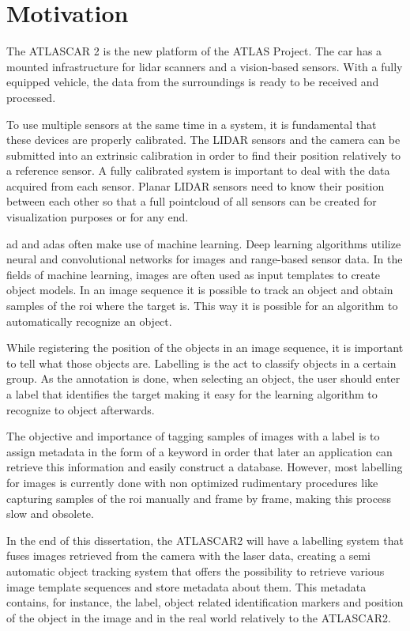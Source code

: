 \section{Motivation}
The ATLASCAR 2 is the new platform of the ATLAS Project. The car has a mounted infrastructure for \gls{lidar} scanners and a vision-based sensors. With a fully equipped vehicle, the data from the surroundings is ready to be received and processed. 

To use multiple sensors at the same time in a system, it is fundamental that these devices are properly calibrated. The LIDAR sensors and the camera can be submitted into an extrinsic calibration in order to find their position relatively to a reference sensor. A fully calibrated system is important to deal with the data acquired from each sensor. Planar LIDAR sensors need to know their position between each other so that a full pointcloud of all sensors can be created for visualization purposes or for any end.

\gls{ad} and \gls{adas} often make use of machine learning. Deep learning algorithms utilize neural and convolutional networks for images and range-based sensor data. In the fields of machine learning, images are often used as input templates to create object models. In an image sequence it is possible to track an object and obtain samples of the \gls{roi} where the target is. This way it is possible for an algorithm to automatically recognize an object.

While registering the position of the objects in an image sequence, it is important to tell what those objects are. Labelling is the act to classify objects in a certain group. As the annotation is done, when selecting an object, the user should enter a label that identifies the target making it easy for the learning algorithm to recognize to object afterwards.

The objective and importance of tagging samples of images with a label is to assign metadata in the form of a keyword in order that later an application can retrieve this information and easily construct a database. However, most labelling for images is currently done with non optimized rudimentary procedures like capturing samples of the \gls{roi} manually and frame by frame, making this process slow and obsolete.

In the end of this dissertation, the ATLASCAR2 will have a labelling system that fuses images retrieved from the camera with the laser data, creating a semi automatic object tracking system that offers the possibility to retrieve various image template sequences and store metadata about them. This metadata contains, for instance, the label, object related identification markers and position of the object in the image and in the real world relatively to the ATLASCAR2.

